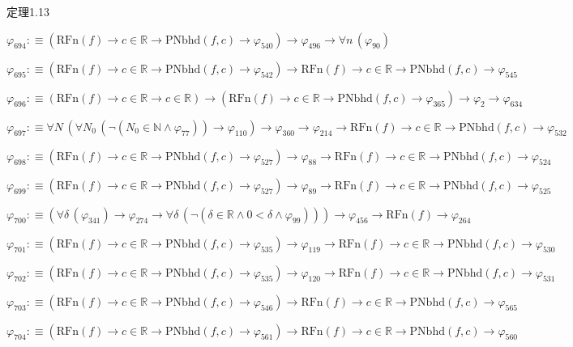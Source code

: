 \begin{fullproof}{定理1.13}
\begin{abbrevlist}
\item $\varphi_{694} :\equiv (\mathrm{RFn}(f) \to c \in \mathbb{R} \to \mathrm{PNbhd}(f,c) \to \varphi_{540}) \to \varphi_{496} \to \forall n\,(\varphi_{90})$
\item $\varphi_{695} :\equiv (\mathrm{RFn}(f) \to c \in \mathbb{R} \to \mathrm{PNbhd}(f,c) \to \varphi_{542}) \to \mathrm{RFn}(f) \to c \in \mathbb{R} \to \mathrm{PNbhd}(f,c) \to \varphi_{545}$
\item $\varphi_{696} :\equiv (\mathrm{RFn}(f) \to c \in \mathbb{R} \to c \in \mathbb{R}) \to (\mathrm{RFn}(f) \to c \in \mathbb{R} \to \mathrm{PNbhd}(f,c) \to \varphi_{365}) \to \varphi_{2} \to \varphi_{634}$
\item $\varphi_{697} :\equiv \forall N\,(\forall N_{0}\,(\neg (N_{0} \in \mathbb{N} \land \varphi_{77})) \to \varphi_{110}) \to \varphi_{360} \to \varphi_{214} \to \mathrm{RFn}(f) \to c \in \mathbb{R} \to \mathrm{PNbhd}(f,c) \to \varphi_{532}$
\item $\varphi_{698} :\equiv (\mathrm{RFn}(f) \to c \in \mathbb{R} \to \mathrm{PNbhd}(f,c) \to \varphi_{527}) \to \varphi_{88} \to \mathrm{RFn}(f) \to c \in \mathbb{R} \to \mathrm{PNbhd}(f,c) \to \varphi_{524}$
\item $\varphi_{699} :\equiv (\mathrm{RFn}(f) \to c \in \mathbb{R} \to \mathrm{PNbhd}(f,c) \to \varphi_{527}) \to \varphi_{89} \to \mathrm{RFn}(f) \to c \in \mathbb{R} \to \mathrm{PNbhd}(f,c) \to \varphi_{525}$
\item $\varphi_{700} :\equiv (\forall \delta\,(\varphi_{341}) \to \varphi_{274} \to \forall \delta\,(\neg (\delta \in \mathbb{R} \land 0 < \delta \land \varphi_{99}))) \to \varphi_{456} \to \mathrm{RFn}(f) \to \varphi_{264}$
\item $\varphi_{701} :\equiv (\mathrm{RFn}(f) \to c \in \mathbb{R} \to \mathrm{PNbhd}(f,c) \to \varphi_{535}) \to \varphi_{119} \to \mathrm{RFn}(f) \to c \in \mathbb{R} \to \mathrm{PNbhd}(f,c) \to \varphi_{530}$
\item $\varphi_{702} :\equiv (\mathrm{RFn}(f) \to c \in \mathbb{R} \to \mathrm{PNbhd}(f,c) \to \varphi_{535}) \to \varphi_{120} \to \mathrm{RFn}(f) \to c \in \mathbb{R} \to \mathrm{PNbhd}(f,c) \to \varphi_{531}$
\item $\varphi_{703} :\equiv (\mathrm{RFn}(f) \to c \in \mathbb{R} \to \mathrm{PNbhd}(f,c) \to \varphi_{546}) \to \mathrm{RFn}(f) \to c \in \mathbb{R} \to \mathrm{PNbhd}(f,c) \to \varphi_{565}$
\item $\varphi_{704} :\equiv (\mathrm{RFn}(f) \to c \in \mathbb{R} \to \mathrm{PNbhd}(f,c) \to \varphi_{561}) \to \mathrm{RFn}(f) \to c \in \mathbb{R} \to \mathrm{PNbhd}(f,c) \to \varphi_{560}$

\end{abbrevlist}
\end{fullproof}

